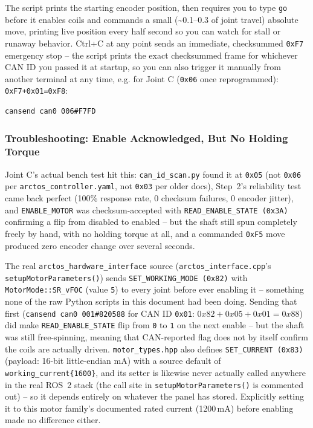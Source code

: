 \documentclass[11pt,letterpaper]{article}
\begin{document}
The script prints the starting encoder position, then requires you to type \texttt{go} before it enables coils and commands a small (\textasciitilde0.1--0.3\textdegree{} of joint travel) absolute move, printing live position every half second so you can watch for stall or runaway behavior. Ctrl+C at any point sends an immediate, checksummed \texttt{0xF7} emergency stop -- the script prints the exact checksummed frame for whichever CAN ID you passed it at startup, so you can also trigger it manually from another terminal at any time, e.g. for Joint C (\texttt{0x06} once reprogrammed): \texttt{0xF7+0x01=0xF8}:

\begin{lstlisting}[language=bash, caption=Emergency Stop for Joint C]
cansend can0 006#F7FD
\end{lstlisting}

\subsubsection{Troubleshooting: Enable Acknowledged, But No Holding Torque}
\label{sec:troubleshoot-no-torque}
Joint C's actual bench test hit this: \texttt{can\_id\_scan.py} found it at \texttt{0x05} (not \texttt{0x06} per \texttt{arctos\_controller.yaml}, not \texttt{0x03} per older docs), Step~2's reliability test came back perfect (100\% response rate, 0 checksum failures, 0 encoder jitter), and \texttt{ENABLE\_MOTOR} was checksum-accepted with \texttt{READ\_ENABLE\_STATE (0x3A)} confirming a flip from disabled to enabled -- but the shaft still spun completely freely by hand, with no holding torque at all, and a commanded \texttt{0xF5} move produced zero encoder change over several seconds.

The real \texttt{arctos\_hardware\_interface} source (\texttt{arctos\_interface.cpp}'s \texttt{setupMotorParameters()}) sends \texttt{SET\_WORKING\_MODE (0x82)} with \texttt{MotorMode::SR\_vFOC} (value \texttt{5}) to every joint before ever enabling it -- something none of the raw Python scripts in this document had been doing. Sending that first (\texttt{cansend can0 001\#820588} for CAN ID \texttt{0x01}: $0x82+0x05+0x01=0x88$) did make \texttt{READ\_ENABLE\_STATE} flip from \texttt{0} to \texttt{1} on the next enable -- but the shaft was still free-spinning, meaning that CAN-reported flag does not by itself confirm the coils are actually driven. \texttt{motor\_types.hpp} also defines \texttt{SET\_CURRENT (0x83)} (payload: 16-bit little-endian mA) with a source default of \texttt{working\_current\{1600\}}, and its setter is likewise never actually called anywhere in the real ROS~2 stack (the call site in \texttt{setupMotorParameters()} is commented out) -- so it depends entirely on whatever the panel has stored. Explicitly setting it to this motor family's documented rated current (1200\,mA) before enabling made no difference either.
\end{document}
